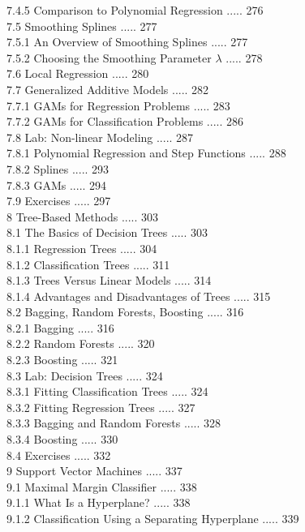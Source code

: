 \documentclass[10pt]{article}
\begin{document}
7.4.5 Comparison to Polynomial Regression ..... 276\\
7.5 Smoothing Splines ..... 277\\
7.5.1 An Overview of Smoothing Splines ..... 277\\
7.5.2 Choosing the Smoothing Parameter $\lambda$ ..... 278\\
7.6 Local Regression ..... 280\\
7.7 Generalized Additive Models ..... 282\\
7.7.1 GAMs for Regression Problems ..... 283\\
7.7.2 GAMs for Classification Problems ..... 286\\
7.8 Lab: Non-linear Modeling ..... 287\\
7.8.1 Polynomial Regression and Step Functions ..... 288\\
7.8.2 Splines ..... 293\\
7.8.3 GAMs ..... 294\\
7.9 Exercises ..... 297\\
8 Tree-Based Methods ..... 303\\
8.1 The Basics of Decision Trees ..... 303\\
8.1.1 Regression Trees ..... 304\\
8.1.2 Classification Trees ..... 311\\
8.1.3 Trees Versus Linear Models ..... 314\\
8.1.4 Advantages and Disadvantages of Trees ..... 315\\
8.2 Bagging, Random Forests, Boosting ..... 316\\
8.2.1 Bagging ..... 316\\
8.2.2 Random Forests ..... 320\\
8.2.3 Boosting ..... 321\\
8.3 Lab: Decision Trees ..... 324\\
8.3.1 Fitting Classification Trees ..... 324\\
8.3.2 Fitting Regression Trees ..... 327\\
8.3.3 Bagging and Random Forests ..... 328\\
8.3.4 Boosting ..... 330\\
8.4 Exercises ..... 332\\
9 Support Vector Machines ..... 337\\
9.1 Maximal Margin Classifier ..... 338\\
9.1.1 What Is a Hyperplane? ..... 338\\
9.1.2 Classification Using a Separating Hyperplane ..... 339\\
\end{document}
